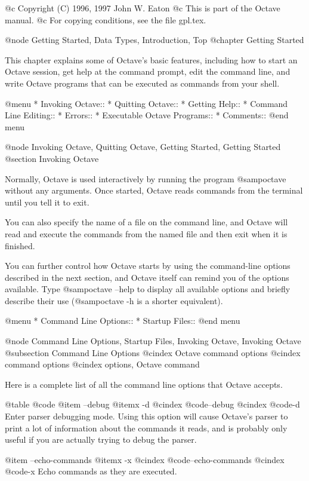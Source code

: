 @c Copyright (C) 1996, 1997 John W. Eaton
@c This is part of the Octave manual.
@c For copying conditions, see the file gpl.tex.

@node Getting Started, Data Types, Introduction, Top
@chapter Getting Started

This chapter explains some of Octave's basic features, including how to
start an Octave session, get help at the command prompt, edit the
command line, and write Octave programs that can be executed as commands
from your shell.

@menu
* Invoking Octave::             
* Quitting Octave::             
* Getting Help::                
* Command Line Editing::        
* Errors::                      
* Executable Octave Programs::  
* Comments::                    
@end menu

@node Invoking Octave, Quitting Octave, Getting Started, Getting Started
@section Invoking Octave

Normally, Octave is used interactively by running the program
@samp{octave} without any arguments.  Once started, Octave reads
commands from the terminal until you tell it to exit.

You can also specify the name of a file on the command line, and Octave
will read and execute the commands from the named file and then exit
when it is finished.

You can further control how Octave starts by using the command-line
options described in the next section, and Octave itself can remind you
of the options available.  Type @samp{octave --help} to display all
available options and briefly describe their use (@samp{octave -h} is a
shorter equivalent).

@menu
* Command Line Options::        
* Startup Files::               
@end menu

@node Command Line Options, Startup Files, Invoking Octave, Invoking Octave
@subsection Command Line Options
@cindex Octave command options
@cindex command options
@cindex options, Octave command

Here is a complete list of all the command line options that Octave
accepts.

@table @code
@item --debug
@itemx -d
@cindex @code{--debug}
@cindex @code{-d}
Enter parser debugging mode.  Using this option will cause Octave's
parser to print a lot of information about the commands it reads, and is
probably only useful if you are actually trying to debug the parser.

@item --echo-commands
@itemx -x
@cindex @code{--echo-commands}
@cindex @code{-x}
Echo commands as they are executed.

